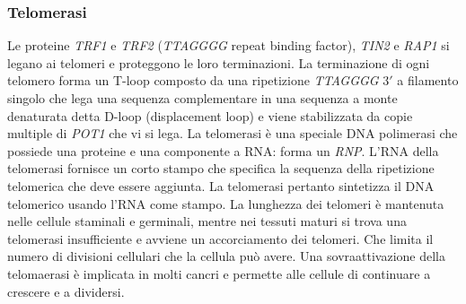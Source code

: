 \subsubsection{Telomerasi}
Le proteine \emph{TRF1} e \emph{TRF2} (\emph{TTAGGGG} repeat binding factor), \emph{TIN2} e \emph{RAP1} si legano ai telomeri e proteggono le loro terminazioni. La terminazione di ogni 
telomero forma un T-loop composto da una ripetizione \emph{TTAGGGG} $3'$ a filamento singolo che lega una sequenza complementare in una sequenza a monte denaturata detta D-loop 
(displacement loop) e viene stabilizzata da copie multiple di \emph{POT1} che vi si lega. La telomerasi \`e una speciale DNA polimerasi che possiede una proteine e una componente 
a RNA: forma un \emph{RNP}. L'RNA della telomerasi fornisce un corto stampo che specifica la sequenza della ripetizione telomerica che deve essere aggiunta. La telomerasi pertanto
sintetizza il DNA telomerico usando l'RNA come stampo. La lunghezza dei telomeri \`e mantenuta nelle cellule staminali e germinali, mentre nei tessuti maturi si trova una telomerasi
insufficiente e avviene un accorciamento dei telomeri. Che limita il numero di divisioni cellulari che la cellula pu\`o avere. Una sovraattivazione della telomaerasi \`e implicata 
in molti cancri e permette alle cellule di continuare a crescere e a dividersi. 


